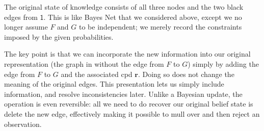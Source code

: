 \documentclass{article}
\theoremstyle{plain}
\theoremstyle{definition}
\newenvironment{example}
	{\pushQED{\qed}\renewcommand{\qedsymbol}{$\triangle$}\examplex}
	{\popQED\endexamplex%
}
\theoremstyle{remark}
\newcommand\mat[1]{\mathbf{#1}}
\numberwithin{equation}{section}
\begin{document}
\begin{example}
		The original state of knowledge consists of all three nodes and the two black edges from $\mathsf 1$. This is like Bayes Net that we considered above, except we no longer assume $F$ and $G$ to be independent; we merely record the constraints imposed by the given probabilities.
	
		The key point is that we can incorporate the new information into
		our original representation (the graph in 
		without the edge from $F$ to $G$) simply  by adding the edge from $F$
		to $G$ and the associated cpd $\mat r$.  Doing so does not change the meaning
		of the original edges.  This presentation lets us simply include
		information, and resolve inconsistencies later. Unlike a Bayesian
		update, the operation is even reversible: all we need to do recover
		our original belief state is delete the new edge, effectively making
		it possible to mull over and then reject an observation.
	\end{example}
\end{document}
